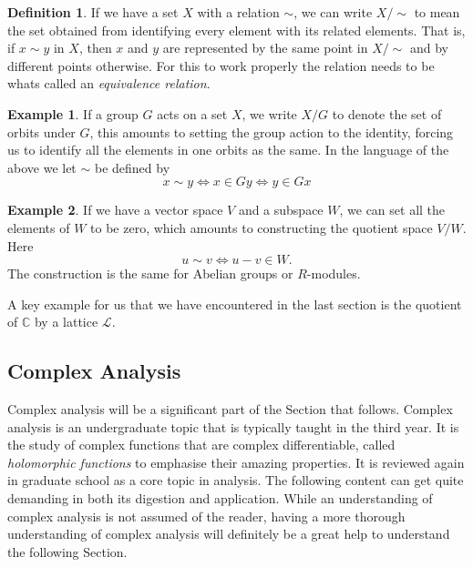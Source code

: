 \documentclass{article}
\theoremstyle{definition}
\newtheorem{definition}{Definition}[section]
\theoremstyle{definition}
\theoremstyle{definition}
\newtheorem{eg}{Example}[section]
\newcommand{\C}{\mathbb{C}}
\begin{document}
\begin{definition}
    
If we have a set $X$ with a relation $\sim$, we can write $X/\sim$ to mean the set obtained from identifying every element with its related elements. That is, if $x\sim y$ in $X$, then $x$ and $y$ are represented by the same point in $X/\sim$ and by different points otherwise. For this to work properly the relation needs to be whats called an \emph{equivalence relation}.

\end{definition}

\begin{eg}
    
If a group $G$ acts on a set $X$, we write $X/G$ to denote the set of orbits under $G$, this amounts to setting the group action to the identity, forcing us to identify all the elements in one orbits as the same. In the language of the above we let $\sim$ be defined by
$$x\sim y\iff x\in Gy\iff y\in Gx$$

\end{eg}
\begin{eg}
If we have a vector space $V$ and a subspace $W$, we can set all the elements of $W$ to be zero, which amounts to constructing the quotient space $V/W$. Here
$$u\sim v\iff u-v\in W.$$
The construction is the same for Abelian groups or $R$-modules.
\end{eg}

A key example for us that we have encountered in the last section is the quotient of $\C$ by a lattice $\mathcal{L}$.

\subsection{Complex Analysis} 

Complex analysis will be a significant part of the Section that follows. Complex analysis is an undergraduate topic that is typically taught in the third year. It is the study of complex functions that are complex differentiable, called \emph{holomorphic functions} to emphasise their amazing properties. It is reviewed again in graduate school as a core topic in analysis. 
\newline\newline
The following content can get quite demanding in both its digestion and application. While an understanding of complex analysis is not assumed of the reader, having a more thorough understanding of complex analysis will definitely be a great help to understand the following Section.
\end{document}
